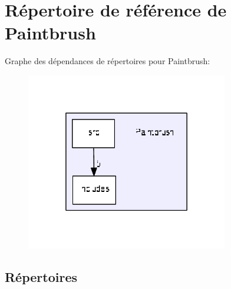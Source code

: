 \section{Répertoire de référence de Paintbrush}
\label{dir_6c052488bb218c7f18cfbb4b47faa176}
Graphe des dépendances de répertoires pour Paintbrush\+:
\nopagebreak
\begin{figure}[H]
\begin{center}
\leavevmode
\includegraphics[width=250pt]{dir_6c052488bb218c7f18cfbb4b47faa176_dep}
\end{center}
\end{figure}
\subsection*{Répertoires}
\begin{DoxyCompactItemize}
\end{DoxyCompactItemize}
